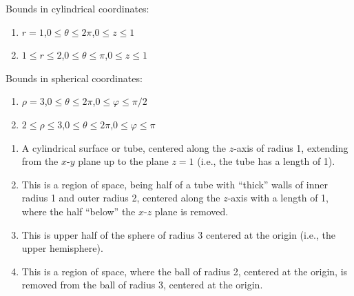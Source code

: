 {Bounds in cylindrical coordinates:
\begin{enumerate}
	\item $r=1$,\quad $0\leq \theta\leq 2\pi$,\quad $0\leq z\leq 1$

	\item $1\leq r\leq 2$,\quad $0\leq \theta\leq \pi$,\quad $0\leq z\leq 1$
\end{enumerate}

Bounds in spherical coordinates:

\begin{enumerate}\addtocounter{enumii}{2}
	\item $\rho=3$,\quad $0\leq \theta\leq2\pi$,\quad $0\leq\varphi\leq \pi/2$
	
	\item $2\leq\rho\leq3$,\quad $0\leq \theta\leq2\pi$,\quad $0\leq\varphi\leq \pi$

\end{enumerate}
}
{\begin{enumerate}
\item	A cylindrical surface or tube, centered along the $z$-axis of radius 1, extending from the $x$-$y$ plane up to the plane $z=1$ (i.e., the tube has a length of 1).

\item	This is a region of space, being half of a tube with ``thick'' walls of inner radius 1 and outer radius 2, centered along the $z$-axis with a length of 1, where the half ``below'' the $x$-$z$ plane is removed. 

\item	This is upper half of the sphere of radius 3 centered at the origin (i.e., the upper hemisphere).

\item	This is a region of space, where the ball of radius 2, centered at the origin, is removed from the ball of radius 3, centered at the origin.

\end{enumerate}
}
